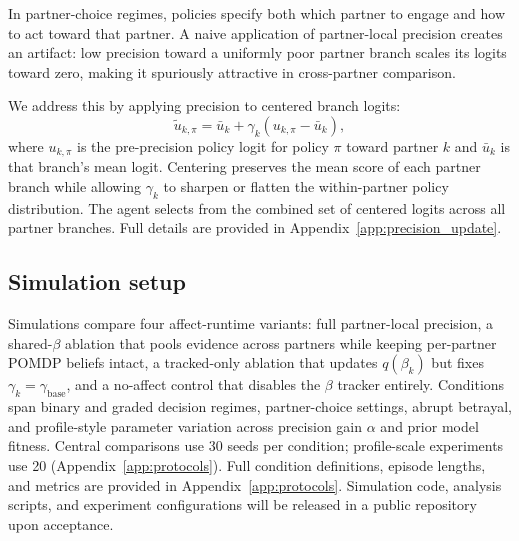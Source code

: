In partner-choice regimes, policies specify both which partner to engage and how to act toward that partner. A naive application of partner-local precision creates an artifact: low precision toward a uniformly poor partner branch scales its logits toward zero, making it spuriously attractive in cross-partner comparison.

We address this by applying precision to centered branch logits:
\begin{equation}
\tilde{u}_{k,\pi} = \bar{u}_k + \gamma_k\left(u_{k,\pi} - \bar{u}_k\right),
\label{eq:centered_logits}
\end{equation}
where $u_{k,\pi}$ is the pre-precision policy logit for policy $\pi$ toward partner $k$ and $\bar{u}_k$ is that branch's mean logit. Centering preserves the mean score of each partner branch while allowing $\gamma_k$ to sharpen or flatten the within-partner policy distribution. The agent selects from the combined set of centered logits across all partner branches. Full details are provided in Appendix~\ref{app:precision_update}.

\subsection{Simulation setup}

Simulations compare four affect-runtime variants: full partner-local precision, a shared-$\beta$ ablation that pools evidence across partners while keeping per-partner POMDP beliefs intact, a tracked-only ablation that updates $q(\beta_k)$ but fixes $\gamma_k = \gamma_{\text{base}}$, and a no-affect control that disables the $\beta$ tracker entirely. Conditions span binary and graded decision regimes, partner-choice settings, abrupt betrayal, and profile-style parameter variation across precision gain $\alpha$ and prior model fitness. Central comparisons use 30 seeds per condition; profile-scale experiments use 20 (Appendix~\ref{app:protocols}). Full condition definitions, episode lengths, and metrics are provided in Appendix~\ref{app:protocols}. Simulation code, analysis scripts, and experiment configurations will be released in a public repository upon acceptance.
